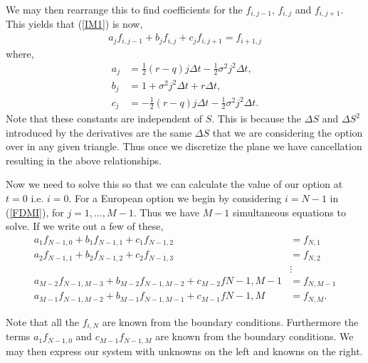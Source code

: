 \documentclass[12pt]{article}
\begin{document}
We may then rearrange this to find coefficients for the $f_{i,j-1}$, $f_{i,j}$ and $f_{i, j+1}$. This yields that (\ref{IM1}) is now,
\begin{align}
	a_jf_{i,j-1} + b_jf_{i,j} + c_jf_{i,j+1} = f_{i+1,j} \label{FDMI}
\end{align}
where,
\begin{align*}
	a_j &= \frac{1}{2}(r-q)j\Delta t - \frac{1}{2}\sigma^2j^2\Delta t, \\
	b_j &= 1 + \sigma^2 j^2 \Delta t + r \Delta t, \\
	c_j &= -\frac{1}{2}(r-q)j\Delta t - \frac{1}{2}\sigma^2j^2\Delta t.
\end{align*}
Note that these constants are independent of $S$. This is because the $\Delta S$ and $\Delta S^2$ introduced by the derivatives are the same $\Delta S$ that we are considering the option over in any given triangle. Thus once we discretize the plane we have cancellation resulting in the above relationships.

Now we need to solve this so that we can calculate the value of our option at $t=0$ i.e. $i=0$. For a European option we begin by considering $i = N-1$ in (\ref{FDMI}), for $j = 1,\dots,M-1$. Thus we have $M-1$ simultaneous equations to solve. If we write out a few of these,
\begin{align*}
	a_1 f_{N-1,0} + b_1 f_{N-1,1} + c_1f_{N-1,2} &= f_{N,1} \\
	a_2 f_{N-1,1} + b_2 f_{N-1,2} + c_2f_{N-1,3} &= f_{N,2} \\
	&\vdots \\
	a_{M-2}f_{N-1,M-3} + b_{M-2}f_{N-1,M-2} + c_{M-2}f{N-1,M-1} &= f_{N,M-1}\\
	a_{M-1}f_{N-1,M-2} + b_{M-1}f_{N-1,M-1} + c_{M-1}f{N-1,M} &= f_{N,M}.
\end{align*}

Note that all the $f_{i,N}$ are known from the boundary conditions. Furthermore the terms $a_1f_{N-1,0}$ and $c_{M-1}f_{N-1,M}$ are known from the boundary conditions. We may then express our system with unknowns on the left and knowns on the right.
\end{document}
